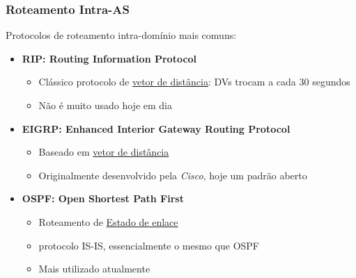         \subsubsection*{Roteamento Intra-AS}
            Protocolos de roteamento intra-domínio mais comuns:
            \begin{itemize}[left=0.5cm, align=left, nosep]
                \item \textbf{RIP: Routing Information Protocol} 
                \begin{itemize}[left=0.5cm, nosep, label=$\hookrightarrow$]
                    \item Clássico protocolo de \underline{vetor de distância}: DVs trocam a cada 30 segundos
                    \item Não é muito usado hoje em dia 
                \end{itemize}
            
                \item \textbf{EIGRP: Enhanced Interior Gateway Routing Protocol} 
                \begin{itemize}[left=0.5cm, nosep, label=$\hookrightarrow$]
                    \item Baseado em \underline{vetor de distância}
                    \item Originalmente desenvolvido pela \textit{Cisco}, hoje um padrão aberto
                \end{itemize}

                \item \textbf{OSPF: Open Shortest Path First} 
                \begin{itemize}[left=0.5cm, nosep, label=$\hookrightarrow$]
                    \item Roteamento de \underline{Estado de enlace}
                    \item protocolo IS-IS, essencialmente o mesmo que OSPF
                    \item Mais utilizado atualmente
                \end{itemize}
            
            \end{itemize}

